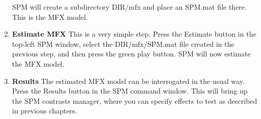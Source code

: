 \begin{enumerate}
    SPM will create a subdirectory DIR/mfx and place an SPM.mat file there. This is the MFX model.

\item \textbf{Estimate MFX}
This is a very simple step. Press the Estimate button in the top-left SPM window, select the DIR/mfx/SPM.mat file created in the previous step, and then press the green play button. SPM will now estimate the MFX model.
\item \textbf{Results}
The estimated MFX model can be interrogated in the usual way. Press the Results button in the SPM command window. This will bring up the SPM contrasts manager, where you can specify effects to test as described in previous chapters.

\end{enumerate}

